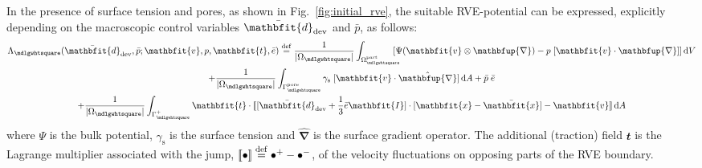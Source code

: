 \documentclass[notitlepage,a4paper,fleqn,9pt]{extarticle}
\renewcommand{\ta}[1]{\mathbfit{#1}}
\renewcommand{\ts}[1]{\mathbfit{#1}}
\renewcommand{\diff}{\mathbfup{\nabla}}
\renewcommand{\Box}{\mdlgwhtsquare}
\newcommand{\volume}{\frac{1}{|\Omega_\Box|}}
\newcommand{\jump}[1]{[\![#1]\!]}
\newcommand{\pore}{\mathrm{pore}}
\newcommand{\particle}{\mathrm{part}}
\newcommand{\surf}{\mathrm{s}}
\newcommand{\figref}[1]{Fig.~\ref{#1}}
\begin{document}
\begin{multicols}{2}
In the presence of surface tension and pores, as shown in \figref{fig:initial_rve}, the suitable RVE-potential can be expressed, explicitly depending on the macroscopic control variables $\bar{\ts d}_\dev$ and $\bar{p}$, as follows:
\begin{multline}
 \Lambda_\Box(\bar{\ts d}_\dev, \bar{p}; \ta v, p, \ta t, \bar{e}) \defeq
     \volume\int_{\Omega_\Box^\particle} \!\!\!\!\![\Psi(\ta v\outerp\diff) - p\;[\ta v\cdot\diff]] \dif V
\\
   + \volume\int_{\Gamma_\Box^\pore} \gamma_\surf \;[\ta v \cdot \hat{\diff}]\dif A
  + \bar{p}\; \bar{e}
\\
  + \volume \int_{\Gamma_\Box^+} \ta t \cdot \jump{[\bar{\ts d}_\dev + \frac13\bar{e}\ts I]\cdot[\ta x - \bar{\ta x}] - \ta v}\dif A
\label{eq:rve_potential}
\end{multline}
where $\Psi$ is the bulk potential, $\gamma_\surf$ is the surface tension and $\hat{\diff}$ is the surface gradient operator.
The additional (traction) field $\ta t$ is the Lagrange multiplier associated with the jump, $\jump{\bullet} \defeq \bullet^+ - \bullet^-$, of the velocity fluctuations on opposing parts of the RVE boundary.


\end{multicols}
\end{document}
